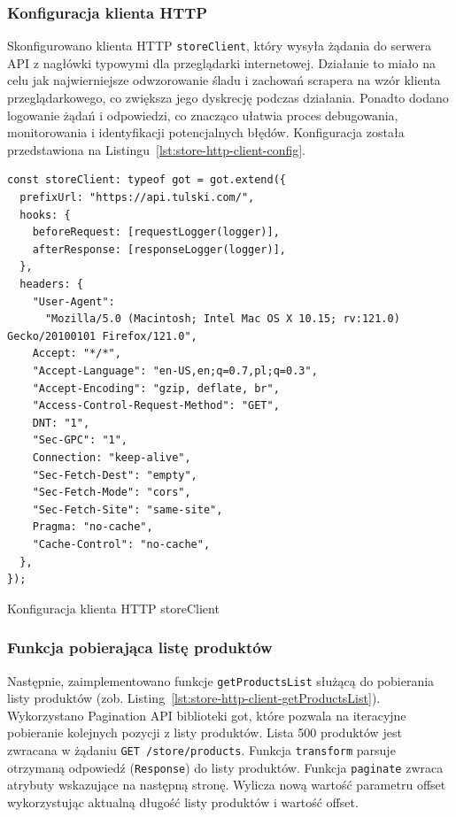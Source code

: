 \subsubsection{Konfiguracja klienta HTTP}

Skonfigurowano klienta HTTP \texttt{storeClient}, który wysyła żądania do serwera API z nagłówki typowymi dla przeglądarki internetowej.
Działanie to miało na celu jak najwierniejsze odwzorowanie śladu i zachowań scrapera na wzór klienta przeglądarkowego, co zwiększa jego dyskrecję podczas działania.
Ponadto dodano logowanie żądań i odpowiedzi, co znacząco ułatwia proces debugowania, monitorowania i identyfikacji potencjalnych błędów.
Konfiguracja została przedstawiona na Listingu~\ref{lst:store-http-client-config}.

\begin{listing}[H]
    \begin{verbatim}
const storeClient: typeof got = got.extend({
  prefixUrl: "https://api.tulski.com/",
  hooks: {
    beforeRequest: [requestLogger(logger)],
    afterResponse: [responseLogger(logger)],
  },
  headers: {
    "User-Agent":
      "Mozilla/5.0 (Macintosh; Intel Mac OS X 10.15; rv:121.0) Gecko/20100101 Firefox/121.0",
    Accept: "*/*",
    "Accept-Language": "en-US,en;q=0.7,pl;q=0.3",
    "Accept-Encoding": "gzip, deflate, br",
    "Access-Control-Request-Method": "GET",
    DNT: "1",
    "Sec-GPC": "1",
    Connection: "keep-alive",
    "Sec-Fetch-Dest": "empty",
    "Sec-Fetch-Mode": "cors",
    "Sec-Fetch-Site": "same-site",
    Pragma: "no-cache",
    "Cache-Control": "no-cache",
  },
});
    \end{verbatim}
    \caption{Konfiguracja klienta HTTP storeClient}
    \label{lst:store-http-client-config}
\end{listing}

\subsubsection{Funkcja pobierająca listę produktów}

Następnie, zaimplementowano funkcje \texttt{getProductsList} służącą do pobierania listy produktów (zob. Listing~\ref{lst:store-http-client-getProductsList}).
Wykorzystano Pagination API biblioteki got\cite{got-paginate-docs}, które pozwala na iteracyjne pobieranie kolejnych pozycji z listy produktów.
Lista 500 produktów jest zwracana w żądaniu \texttt{GET /store/products}.
Funkcja \texttt{transform} parsuje otrzymaną odpowiedź (\texttt{Response}) do listy produktów.
Funkcja \texttt{paginate} zwraca atrybuty wskazujące na następną stronę. Wylicza nową wartość parametru offset wykorzystując aktualną długość listy produktów i wartość offset.

